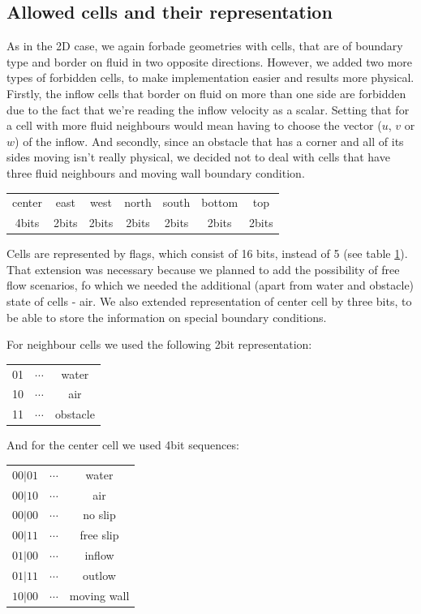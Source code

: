 \documentclass[a4paper, 12pt]{article}
\begin{document}
\subsection{Allowed cells and their representation}\label{sec:forb}
As in the 2D case, we again forbade geometries with cells, that are of boundary type and border on fluid in two opposite directions. However, 
we added two more types of forbidden cells, to make implementation easier and results more physical.
Firstly, the inflow cells that border on fluid on more than one side are forbidden due to the fact that we're reading the inflow velocity as a scalar.
Setting that for a cell with more fluid neighbours would mean having to choose the vector ($u$, $v$ or $w$) of the inflow.    
And secondly, since an obstacle that has a corner and all of its sides moving isn't really physical, we decided not to deal with cells that have three
fluid neighbours and moving wall boundary condition.

\begin{table}[H]
\label{tab4}
\centering
\begin{tabular}{|c||c|c|c|c|c|c|}
\hline
center & east & west & north & south & bottom & top \\ 
4bits & 2bits & 2bits & 2bits & 2bits & 2bits & 2bits\\
\hline
\end{tabular}
\end{table} 
Cells are represented by flags, which consist of 16 bits, instead of 5 (see table \ref{tab4}). That extension was necessary because we planned to add the possibility of free flow scenarios,
fo which we needed the additional (apart from water and obstacle) state of cells - air. We also extended representation of center cell by three bits, to
be able to store the information on special boundary conditions.



For neighbour cells we used the following 2bit representation: 
\begin{center}
\begin{tabular}{ccc}
01 & $\cdots$ & water \\
10 & $\cdots$ & air \\
11 & $\cdots$ & obstacle
\end{tabular}
\end{center}
And for the center cell we used 4bit sequences:
\begin{center}
\begin{tabular}{ccc}
$00|01$ & $\cdots$ & water \\
$00|10$ & $\cdots$ & air \\
$00|00$ & $\cdots$ & no slip \\
$00|11$ & $\cdots$ & free slip \\
$01|00$ & $\cdots$ & inflow \\
$01|11$ & $\cdots$ & outlow \\
$10|00$ & $\cdots$ & moving wall 
\end{tabular}
\end{center}
\end{document}
